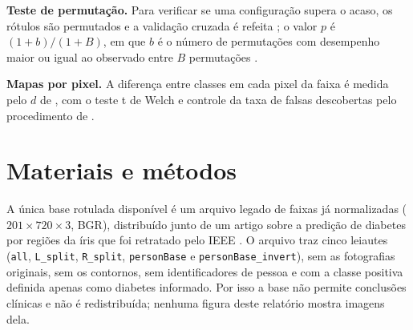 \textbf{Teste de permutação.} Para verificar se uma configuração supera o
acaso, os rótulos são permutados e a validação cruzada é refeita
\citep*{OjalaGarriga2010}; o valor $p$ é $(1+b)/(1+B)$, em que $b$ é o número
de permutações com desempenho maior ou igual ao observado entre $B$
permutações \citep*{PhipsonSmyth2010}.

\textbf{Mapas por pixel.} A diferença entre classes em cada pixel da faixa é
medida pelo $d$ de \citet{Cohen1988}, com o teste t de Welch e controle da
taxa de falsas descobertas pelo procedimento de
\citet{BenjaminiHochberg1995}.

\chapter{Materiais e métodos}
\label{cap:metodos}

\label{sec:base}

A única base rotulada disponível é um arquivo legado de faixas já
normalizadas ($201\times720\times3$, BGR), distribuído junto de um artigo
sobre a predição de diabetes por regiões da íris que foi retratado pelo IEEE
\citep*{Moradi2018}. O arquivo traz cinco leiautes (\texttt{all},
\texttt{L\_split}, \texttt{R\_split}, \texttt{personBase} e
\texttt{personBase\_invert}), sem as fotografias originais, sem os contornos,
sem identificadores de pessoa e com a classe positiva definida apenas como
diabetes informado. Por isso a base não permite conclusões clínicas e não é
redistribuída; nenhuma figura deste relatório mostra imagens dela.

